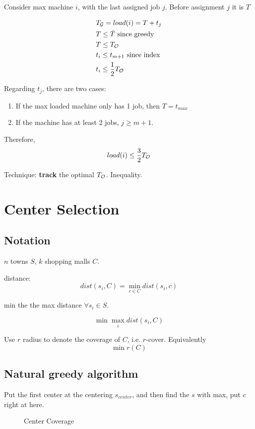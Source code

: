 \documentclass[a4paper]{report}
\theoremstyle{definition}
\begin{document}
Consider max machine $i$, with the last assigned job $j$. Before assignment $j$ it is $T$

\begin{align*}
& T_{\mathcal{G}}=load(i) = T+t_j\\
& T \leq \bar T \text{ since greedy}\\
& T \leq T_{\mathcal{O}} \\
& t_i \leq t_{m+1} \text{ since index} \\
& t_i \leq \frac{1}{2}T_{\mathcal{O}}
\end{align*}

Regarding $t_j$, there are two cases:
\begin{enumerate}
\item If the max loaded machine only has 1 job, then $T = t_{max}$
\item If the machine has at least 2 jobs, $j\geq m+1$.
\end{enumerate}

Therefore,
$$load(i)\leq \frac{3}{2} T_{\mathcal{O}}$$

Technique: \textbf{track} the optimal $T_{\mathcal{O}}$. Inequality.

\section{Center Selection}
\subsection{Notation}
$n$ towns $S$, $k$ shopping malls $C$.

distance:
$$
dist(s_i, C) =\min_{c\in C} dist(s_i, c)
$$

min the the max distance $\forall s_i \in S$.

$$
\min \max_i dist(s_i, C)
$$

Use $r$ radius to denote the coverage of $C$, i.e. $r$-cover. Equivalently
$$
\min r(C)
$$
\subsection{Natural greedy algorithm}
Put the first center at the centering $s_{center}$, and then find the $s$ with max, put $c$ right at here.

\begin{figure}[!htp]
\centering
{}
\caption{Center Coverage}
\label{fig:11_4}
\end{figure}
\end{document}
